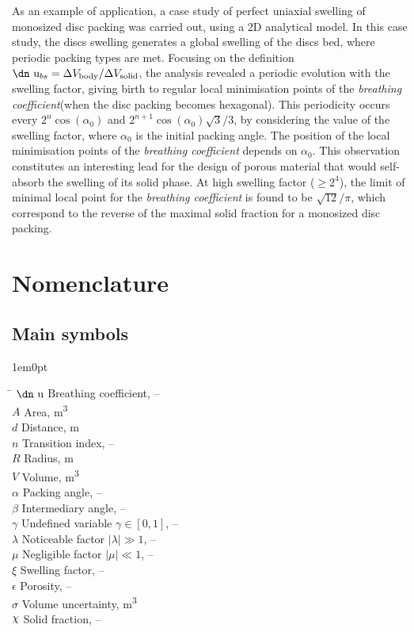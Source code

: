 \documentclass[11pt]{article}
\newcommand{\brco}{\textit{breathing coefficient}\xspace}
\newcommand{\tSup}[1]{\textsuperscript{#1}}
\newcommand{\Vbody}{V_{\text{body}}}
\newcommand{\Vsolid}{V_{\text{solid}}}
\newcommand{\DVbody}{\Delta \Vbody}
\newcommand{\DVsolid}{\Delta \Vsolid}
\newcommand{\udan}{\text{\dn u}}
\newcommand{\udanbs}{\udan_{bs}}
\let\oldchi\chi
\renewcommand{\chi}{\raisebox{0.2ex}{$\oldchi$}}
\newenvironment{customnomenclature}
{\begin{adjustwidth}{1em}{0pt}
		\begin{tabbing}
			\hspace{50pt}\=\kill}
		{	\end{tabbing} 
\end{adjustwidth}}
\begin{document}
As an example of application, a case study of perfect uniaxial swelling of
monosized disc packing was carried out, using a 2D analytical model. In this
case study, the discs swelling generates a global swelling of the discs bed,
where periodic packing types are met. Focusing on the definition $\udanbs =
\DVbody / \DVsolid$, the analysis revealed a periodic evolution with the
swelling factor, giving birth to regular local minimisation points of the
\brco (when the disc packing becomes hexagonal). This periodicity occurs
every $2^n\cos(\alpha_0)$ and $2^{n+1}\cos(\alpha_0)\sqrt{3}/3$, by considering
the value of the swelling factor, where $\alpha_0$ is the initial packing angle.
The position of the local minimisation points of the \brco depends on
$\alpha_0$. This observation constitutes an interesting lead for the design of
porous material that would self-absorb the swelling of its solid phase. At high
swelling factor ($\ge 2^4$), the limit of minimal local point for the \brco is
found to be $\sqrt{12}/\pi$, which correspond to the reverse of the maximal
solid fraction for a monosized disc packing.


\section*{Nomenclature}

\subsection{Main symbols}
\begin{customnomenclature}
	$\udan$ \> Breathing coefficient, – \\
	$A$ \> Area, m\tSup{3} \\
	$d$ \> Distance, m \\
	$n$ \> Transition index, – \\
	$R$ \> Radius, m \\
	$V$ \> Volume, m\tSup{3} \\
	$\alpha$ \> Packing angle, – \\
	$\beta$ \> Intermediary angle, – \\
	$\gamma$ \> Undefined variable $\gamma \in [0, 1]$, – \\
	$\lambda$ \> Noticeable factor $|\lambda| \gg 1$, – \\
	$\mu$ \> Negligible factor $|\mu| \ll 1$, – \\
	$\xi$ \> Swelling factor, – \\
	$\epsilon$ \> Porosity, – \\
	$\sigma$ \> Volume uncertainty, m\tSup{3} \\
	$\chi$ \> Solid fraction, – \\
\end{customnomenclature}
\end{document}
